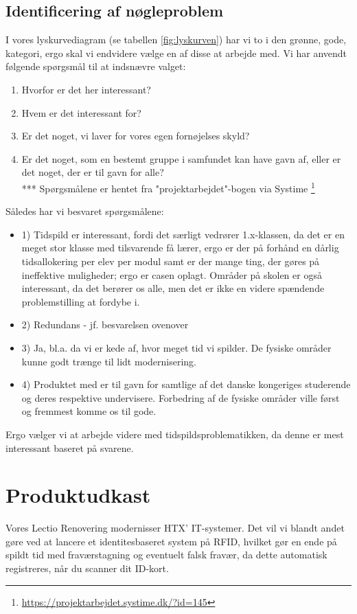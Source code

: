 \documentclass[12pt, a4paper]{article}
\begin{document}
\subsection{Identificering af nøgleproblem}
I vores lyskurvediagram (se tabellen \ref{fig:lyskurven}) har vi to i den grønne, gode, kategori, ergo skal vi endvidere vælge en af disse at arbejde med. 
Vi har anvendt følgende spørgsmål til at indsnævre valget:
\begin{enumerate}
    \item Hvorfor er det her interessant?
    \item Hvem er det interessant for?
    \item Er det noget, vi laver for vores egen fornøjelses skyld?
    \item Er det noget, som en bestemt gruppe i samfundet kan have gavn af, eller er det noget, der er til gavn for alle?\\*** Spørgsmålene er hentet fra "projektarbejdet"-bogen via Systime \footnote{\url{https://projektarbejdet.systime.dk/?id=145}}
\end{enumerate}
Således har vi besvaret spørgsmålene:
\begin{itemize}
\item 1) Tidspild er interessant, fordi det særligt vedrører 1.x-klassen, da det er en meget stor klasse med tilsvarende få lærer, ergo er der på forhånd en dårlig tidsallokering per elev per modul samt er der mange ting, der gøres på ineffektive muligheder; ergo er casen oplagt. Områder på skolen er også interessant, da det berører os alle, men det er ikke en videre spændende problemstilling at fordybe i.
\item 2) Redundans - jf. besvarelsen ovenover
\item 3) Ja, bl.a. da vi er kede af, hvor meget tid vi spilder. De fysiske områder kunne godt trænge til lidt modernisering.
\item 4) Produktet med er til gavn for samtlige af det danske kongeriges studerende og deres respektive undervisere. Forbedring af de fysiske områder ville først og fremmest komme os til gode.
\end{itemize}

Ergo vælger vi at arbejde videre med tidspildsproblematikken, da denne er mest interessant baseret på svarene.
\section{Produktudkast}
    Vores Lectio Renovering modernisser HTX' IT-systemer. Det vil vi blandt andet gøre ved at lancere et identitesbaseret system på RFID, hvilket gør en ende på spildt tid med fraværstagning og eventuelt falsk fravær, da dette automatisk registreres, når du scanner dit ID-kort. 
\end{document}
